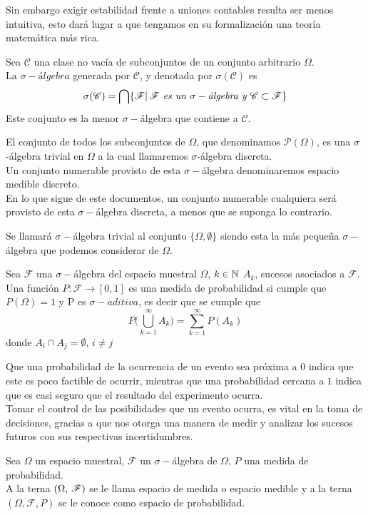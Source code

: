Sin embargo exigir estabilidad frente a uniones contables resulta ser menos intuitiva, esto dará lugar a que tengamos en su formalización una teoría matemática más rica.
\begin{Def}
    Sea $\mathscr{C}$ una clase no vacía de subconjuntos de un conjunto arbitrario $\Omega$.\\La $\sigma-\textit{álgebra}$ generada por $\mathscr{C}$, y denotada por $\sigma(\mathscr{C})$ es $$\sigma(\mathscr{C})=\bigcap\{\mathscr{F}|\thinspace\mathscr{F} \textit{ es un }\sigma-\textit{álgebra y }  \mathscr{C}\subset\mathscr{F}\}$$
    Este conjunto es la menor $\sigma-$álgebra que contiene a $\mathscr{C}$.
\end{Def}
\begin{Ejm}
    El conjunto de todos los subconjuntos de $\Omega$, que denominamos $\mathscr{P}(\Omega)$, es una $\sigma$-álgebra trivial en $\Omega$ a la cual llamaremos $\sigma$-álgebra discreta. \\ Un conjunto numerable provisto de esta $\sigma-$álgebra denominaremos espacio medible discreto.\\
    En lo que sigue de este documentos, un conjunto numerable cualquiera será provisto de esta $\sigma-$álgebra discreta, a menos que se suponga lo contrario.
\end{Ejm}
\begin{Ejm}
    Se llamará $\sigma-$álgebra trivial al conjunto $\{\Omega, \emptyset\}$ siendo esta la más pequeña $\sigma-$álgebra que podemos considerar de $\Omega$. 
\end{Ejm}
\begin{Def}
    \label{def-medidaProbabilidad}
    Sea $\mathscr{F}$ una $\sigma-$álgebra del espacio muestral $\Omega$, $k\in{\mathbb{N}}$ $A_k$, sucesos asociados a $\mathscr{F}$.
    Una función $P:\mathscr{F}\rightarrow [0,1]$ es una medida de probabilidad si cumple que $P(\Omega)=1$ y P es $\sigma-aditiva$, es decir que se cumple que $$P\big(\bigcup_{k=1}^\infty A_k\big)=\sum_{k=1}^\infty P(A_k)$$
    donde $A_i\cap A_j=\emptyset$,  $i\not= j$
\end{Def}
Que una probabilidad de la ocurrencia de un evento sea próxima a $0$ indica que este es poco factible de ocurrir, mientras que una probabilidad cercana a $1$ indica que es casi seguro que el resultado del experimento ocurra.\\
Tomar el control de las posibilidades que un evento ocurra, es vital en la toma de decisiones, gracias a que nos otorga una manera de medir y analizar los sucesos futuros con sus respectivas incertidumbres.
\begin{Def}
    Sea $\Omega$ un espacio muestral, $\mathscr{F}$ un $\sigma-$álgebra de $\Omega$, $P$ una medida de probabilidad.\\
    A la terna $(\Omega,\thinspace\mathscr{F})$ se le llama espacio de medida o espacio medible y a la terna $(\Omega,\mathscr{F},P)$ se le conoce como espacio de probabilidad.
\end{Def}